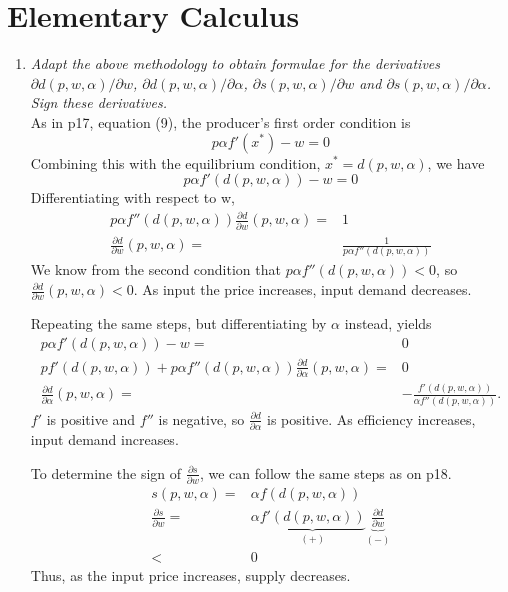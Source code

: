 \documentclass[10pt]{article}
\begin{document}
\section{Elementary Calculus}
\renewcommand{\labelenumi}{\arabic{enumi}}
\begin{enumerate}
\item \textit{Adapt the above methodology to obtain formulae for the
    derivatives $\partial d(p, w, \alpha)/\partial w$, $\partial d(p, w, \alpha)/\partial \alpha$,
    $\partial s(p, w, \alpha)/\partial w$ and $\partial s(p, w, \alpha)/\partial \alpha$.  Sign these
    derivatives.}\\
  As in p17, equation (9), the producer's first order condition is 
  \[ p\alpha f'(x^*) - w = 0 \]
  Combining this with the equilibrium condition, $x^* =
  d(p,w,\alpha)$, we have
  \[ p \alpha f'(d(p,w,\alpha)) - w = 0 \]
  Differentiating with respect to w, 
  \begin{align*}
    p \alpha f''\left(d(p,w,\alpha)\right) \frac{\partial d}{\partial
      w}(p,w,\alpha) = & 1\\
    \frac{\partial d}{\partial
      w}(p,w,\alpha) = & \frac{1}{p\alpha f''
      \left(d(p,w,\alpha)\right)}
  \end{align*}
  We know from the second condition that $p\alpha f''(d(p,w,\alpha)) <
  0$, so $\frac{\partial d}{\partial w}(p,w,\alpha) < 0$. As input the
  price increases, input demand decreases. 

  Repeating the same steps, but differentiating by $\alpha$ instead,
  yields
  \begin{align*}
    p \alpha f'\left(d(p,w,\alpha)\right) -w = & 0  \\
    p f'\left(d(p,w,\alpha)\right) + p \alpha f''\left(d(p,w,\alpha)\right) \frac{\partial d} {\partial
      \alpha} (p,w,\alpha) = & 0 \\
    \frac{\partial d} {\partial
      \alpha} (p,w,\alpha)  = & -\frac{f'\left(d(p,w,\alpha)\right)} {\alpha
      f''\left(d(p,w,\alpha)\right) } .
  \end{align*}
  $f'$ is positive and $f''$ is negative, so $\frac{\partial d} {\partial
    \alpha} $ is positive. As efficiency increases, input demand
  increases. 
  
  To determine the sign of $\frac{\partial s} {\partial w}$, we can
  follow the same steps as on p18. 
  \begin{align*}
    s(p,w,\alpha) = & \alpha f(d(p,w,\alpha)) \\
    \frac{\partial s}{\partial w} = & \alpha
    \underbrace{f'\left(d(p,w,\alpha)\right)}_{(+)} 
    \underbrace{\frac{\partial d}{\partial w}}_{(-)} \\
    < & 0
  \end{align*}
  Thus, as the input price increases, supply decreases. 


\end{enumerate}
\end{document}
